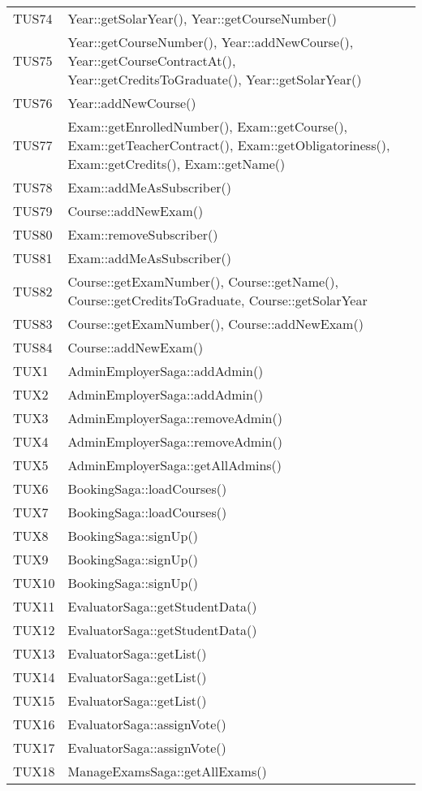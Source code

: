 \documentclass[PianoDiQualifica.tex]{subfiles}
\begin{document}
\begin{longtable}[H]{P{5cm}P{9cm}}
	TUS74 & Year::getSolarYear(), Year::getCourseNumber()\\
	TUS75 & Year::getCourseNumber(), Year::addNewCourse(), Year::getCourseContractAt(), Year::getCreditsToGraduate(), Year::getSolarYear() \\
	TUS76 & Year::addNewCourse()\\
	TUS77 & Exam::getEnrolledNumber(), Exam::getCourse(), Exam::getTeacherContract(), Exam::getObligatoriness(), Exam::getCredits(), Exam::getName()\\
	TUS78 & Exam::addMeAsSubscriber()\\
	TUS79 & Course::addNewExam()\\
	TUS80 & Exam::removeSubscriber()\\
	TUS81 & Exam::addMeAsSubscriber()\\
	TUS82 & Course::getExamNumber(), Course::getName(), Course::getCreditsToGraduate, Course::getSolarYear\\
	TUS83 & Course::getExamNumber(), Course::addNewExam()\\
	TUS84 & Course::addNewExam()\\
	\hhline{==}
	\hhline{==}
	TUX1 & AdminEmployerSaga::addAdmin() \\
	TUX2 & AdminEmployerSaga::addAdmin() \\
	TUX3 & AdminEmployerSaga::removeAdmin() \\
	TUX4 & AdminEmployerSaga::removeAdmin() \\
	TUX5 & AdminEmployerSaga::getAllAdmins() \\
	TUX6 & BookingSaga::loadCourses() \\
	TUX7 & BookingSaga::loadCourses() \\
	TUX8 & BookingSaga::signUp() \\
	TUX9 & BookingSaga::signUp() \\
	TUX10 & BookingSaga::signUp() \\
	TUX11 & EvaluatorSaga::getStudentData() \\
	TUX12 & EvaluatorSaga::getStudentData() \\
	TUX13 & EvaluatorSaga::getList() \\
	TUX14 & EvaluatorSaga::getList() \\
	TUX15 & EvaluatorSaga::getList() \\
	TUX16 & EvaluatorSaga::assignVote() \\
	TUX17 & EvaluatorSaga::assignVote() \\
	TUX18 & ManageExamsSaga::getAllExams() \\

\end{longtable}
\end{document}
